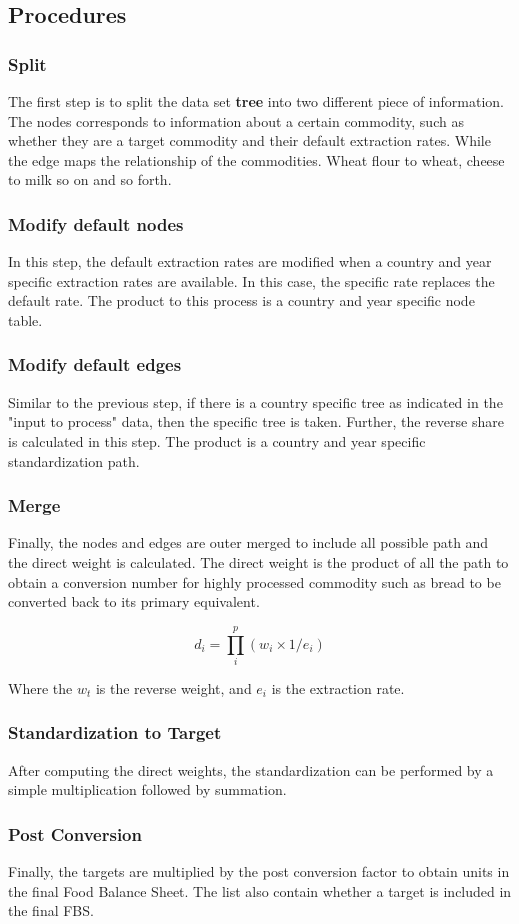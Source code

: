 \documentclass{article}
\begin{document}
\subsection{Procedures}

\subsubsection{Split}
The first step is to split the data set \textbf{tree} into two
different piece of information. The nodes corresponds to information
about a certain commodity, such as whether they are a target commodity
and their default extraction rates. While the edge maps the
relationship of the commodities. Wheat flour to wheat, cheese to milk
so on and so forth.

\subsubsection{Modify default nodes}
In this step, the default extraction rates are modified when a country
and year specific extraction rates are available. In this case, the
specific rate replaces the default rate. The product to this process
is a country and year specific node table.

\subsubsection{Modify default edges}
Similar to the previous step, if there is a country specific tree as
indicated in the "input to process" data, then the specific tree is
taken. Further, the reverse share is calculated in this step. The
product is a country and year specific standardization path.

\subsubsection{Merge}
Finally, the nodes and edges are outer merged to include all possible
path and the direct weight is calculated. The direct weight is the
product of all the path to obtain a conversion number for highly
processed commodity such as bread to be converted back to its primary
equivalent.

$$
d_i = \prod_{i}^{p} (w_i \times 1/e_i)
$$

Where the $w_t$ is the reverse weight, and $e_i$ is the extraction
rate.

\subsubsection{Standardization to Target}
After computing the direct weights, the standardization can be
performed by a simple multiplication followed by summation.

\subsubsection{Post Conversion}
Finally, the targets are multiplied by the post conversion factor to
obtain units in the final Food Balance Sheet. The list also contain
whether a target is included in the final FBS.
\end{document}
